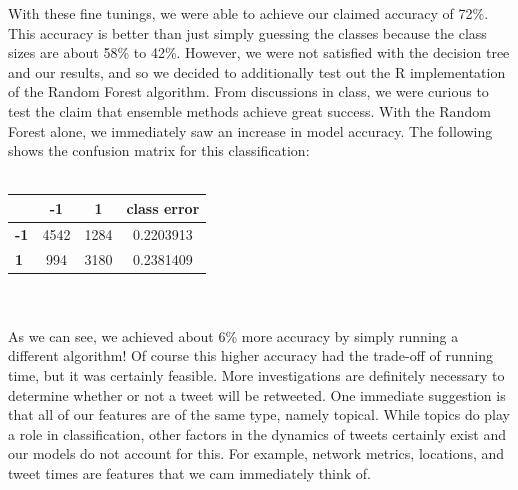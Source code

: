 \documentclass[12pt]{article}
\begin{document}
With these fine tunings, we were able to achieve our claimed accuracy of 72\%. This accuracy is better than just simply guessing the classes because the class sizes are about 58\% to 42\%. However, we were not satisfied with the decision tree and our results, and so we decided to additionally test out the R implementation of the Random Forest algorithm. From discussions in class, we were curious to test the claim that ensemble methods achieve great success. With the Random Forest alone, we immediately saw an increase in model accuracy. The following shows the confusion matrix for this classification:\\
\\
\begin{centering}
\begin{tabular}[b]{l||c|c|c} \\
    \textbf{} &\textbf{-1} &\textbf{1} &\textbf{class error}\\
    \hline 
    \textbf{-1} &4542 &1284 &0.2203913\\
    \hline
    \textbf{1} &994 &3180 &0.2381409 \\
\end{tabular}
\end{centering}
\\
\\
As we can see, we achieved about 6\% more accuracy by simply running a different algorithm! Of course this higher accuracy had the trade-off of running time, but it was certainly feasible. More investigations are definitely necessary to determine whether or not a tweet will be retweeted. One immediate suggestion is that all of our features are of the same type, namely topical. While topics do play a role in classification, other factors in the dynamics of tweets certainly exist and our models do not account for this. For example, network metrics, locations, and tweet times are features that we cam immediately think of.
\end{document}
